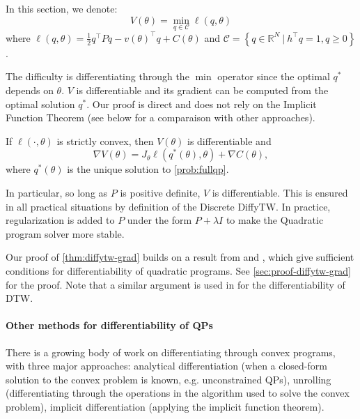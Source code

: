 In this section, we denote:
\begin{equation}\label{prob:fullqp}
    V(\theta) = \min_{q\in\mathcal C} \ell(q, \theta)
\end{equation}
where $\ell(q, \theta) = \frac{1}{2} q^\top Pq - v(\theta)^\top q + C(\theta)$ and $\mathcal C = \left\lbrace q\in\mathbb R^N ~\vert~ h^\top q=1, q \geq 0\right\rbrace$.

The difficulty is differentiating through the $\min$ operator since the optimal $q^*$ depends on $\theta$. $V$ is differentiable and its gradient can be computed from the optimal solution $q^*$. Our proof is direct and does not rely on the Implicit Function Theorem (see below for a comparaison with other approaches).

\begin{theorem}\label{thm:diffytw-grad}
    If $\ell(\cdot, \theta)$ is strictly convex, then $V(\theta)$ is differentiable and
    \begin{equation}
        \nabla V(\theta) = J_\theta \ell(q^*(\theta), \theta) + \nabla C(\theta),
    \end{equation} where $q^*(\theta)$ is the unique solution to \cref{prob:fullqp}.
\end{theorem}

In particular, so long as $P$ is positive definite, $V$ is differentiable. This is ensured in all practical situations by definition of the Discrete DiffyTW. In practice, regularization is added to $P$ under the form $P + \lambda I$ to make the Quadratic program solver more stable.

Our proof of \cref{thm:diffytw-grad} builds on a result from \cite{shapiro} and \cite{lee}, which give sufficient conditions for differentiability of quadratic programs. See \cref{sec:proof-diffytw-grad} for the proof. Note that a similar argument is used in \cite{tavenard-dtw-diff} for the differentiability of DTW.

\paragraph{Other methods for differentiability of QPs}
There is a growing body of work on differentiating through convex programs, with three major approaches: analytical differentiation (when a closed-form solution to the convex problem is known, e.g. unconstrained QPs), unrolling (differentiating through the operations in the algorithm used to solve the convex problem), implicit differentiation (applying the implicit function theorem).

